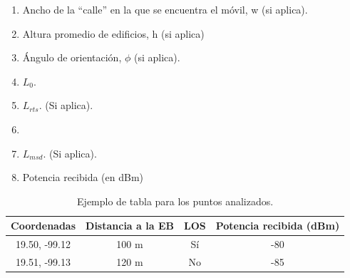 \begin{enumerate}
\begin{enumerate}
            \item Ancho de la “calle” en la que se encuentra el móvil, w (si aplica). 
            \item Altura promedio de edificios, h (si aplica) 
            \item Ángulo de orientación, $\phi$ (si aplica).
            \item $L_0.$
            \item $L_{rts}$. (Si aplica).
            \item \item $L_{msd}$. (Si aplica).
            \item Potencia recibida (en dBm) 
          \end{enumerate}
                \begin{table}[H]
                \centering
                \begin{tabular}{|c|c|c|c|}
                    \hline
                    Coordenadas & Distancia a la EB & LOS & Potencia recibida (dBm) \\
                    \hline
                    19.50, -99.12 & 100 m & Sí & -80 \\
                    19.51, -99.13 & 120 m & No & -85 \\
                    \hline
                \end{tabular}
                \caption{Ejemplo de tabla para los puntos analizados.}
                \label{tab:ejemplo}
            \end{table}          


\end{enumerate}